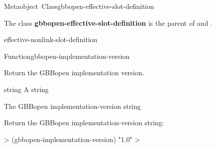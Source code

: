 \documentclass[10pt,twoside,english,pdftex]{article}
\begin{document}
\begin{functiondoc}{Metaobject~Class}{gbbopen-effective-slot-definition}{}
%

\fnsyntax

\fnpackage {}

\fnmodule {}

\fndescription The class \textbf{gbbopen-effective-slot-definition} is the
parent  of \textbf{} and
\textbf{}.
 
\begin{alsos}{effective-nonlink-slot-definition}
\end{alsos}

\end{functiondoc}


\begin{functiondoc}{Function}{gbbopen-implementation-version}{\noargs{}
    \returns{} }
%
%

\fnsyntax

\fnpurpose Return the GBBopen implementation version.

\fnpackage {}

\fnmodule {}

\fnargs
\begin{args}{string}
\arg[string] A string
\end{args}

\fnreturns The GBBopen implementation-version string

\fnexample
Return the GBBopen implementation-version string:
%
\W\supp
\begin{example}
  > (gbbopen-implementation-version)
  "1.0"
  >
\end{example}

\end{functiondoc}

\end{document}

